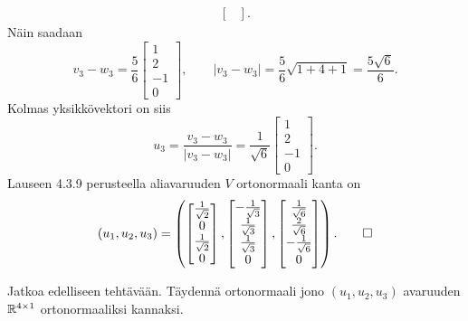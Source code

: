 \documentclass[11pt,a4paper]{amsart}
\begin{document}
\begin{solution}
\begin{enumerate}[label=(\alph*), leftmargin=*]
\[\begin{aligned}
\begin{bmatrix}
          \end{bmatrix}.
        \end{aligned}
      \]
      Näin saadaan
      \[
        v_3-w_3=\frac56
        \begin{bmatrix}1 \\ 2 \\ -1 \\ 0
        \end{bmatrix},
        \qquad
        |v_3-w_3|=\frac56\sqrt{1+4+1}=\frac{5\sqrt6}{6}.
      \]
      Kolmas yksikkövektori on siis
      \[
        u_3=\frac{v_3-w_3}{|v_3-w_3|}
        =\frac1{\sqrt6}
        \begin{bmatrix}1 \\ 2 \\ -1 \\ 0
        \end{bmatrix}.
      \]
      Lauseen 4.3.9 perusteella aliavaruuden \(V\) ortonormaali kanta on
      \begingroup
      \renewcommand{\arraystretch}{1.35}
      \[
        (u_1,u_2,u_3)=
        \left(
          \begin{bmatrix}\frac1{\sqrt2} \\ 0 \\ \frac1{\sqrt2} \\ 0
          \end{bmatrix},
          \begin{bmatrix}-\frac1{\sqrt3} \\ \frac1{\sqrt3}
            \\ \frac1{\sqrt3} \\ 0
          \end{bmatrix},
          \begin{bmatrix}\frac1{\sqrt6} \\ \frac2{\sqrt6}
            \\ -\frac1{\sqrt6} \\ 0
          \end{bmatrix}
        \right).\qedhere
      \]
      \endgroup
  \end{enumerate}
\end{solution}

\newpage

\begin{exercise}
  Jatkoa edelliseen tehtävään. Täydennä ortonormaali jono
  \((u_1,u_2,u_3)\) avaruuden \(\mathbb{R}^{4\times 1}\) ortonormaaliksi
  kannaksi.
\end{exercise}
\end{document}
